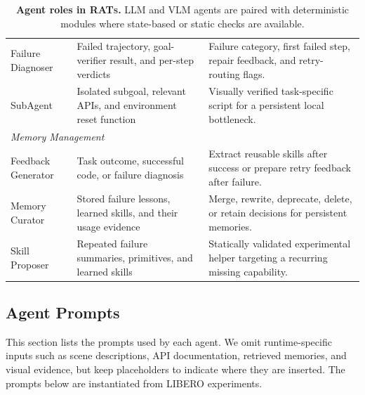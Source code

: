 \documentclass{llmxive}
\begin{document}
\begin{table}[t]
\begin{tabular}{p{} p{} p{}}
Failure Diagnoser &
Failed trajectory, goal-verifier result, and per-step verdicts &
Failure category, first failed step, repair feedback, and retry-routing flags. \\

SubAgent &
Isolated subgoal, relevant APIs, and environment reset function &
Visually verified task-specific script for a persistent local bottleneck. \\

\midrule
\multicolumn{3}{l}{\textit{Memory Management}} \\
\midrule
Feedback Generator &
Task outcome, successful code, or failure diagnosis &
Extract reusable skills after success or prepare retry feedback after failure. \\

Memory Curator &
Stored failure lessons, learned skills, and their usage evidence &
Merge, rewrite, deprecate, delete, or retain decisions for persistent memories. \\

Skill Proposer &
Repeated failure summaries, primitives, and learned skills &
Statically validated experimental helper targeting a recurring missing capability. \\
\bottomrule
\end{tabular}
\caption{
\textbf{Agent roles in \textsc{RATs}.}
LLM and VLM agents are paired with deterministic modules where state-based or
static checks are available.
}
\end{table}

\subsection{Agent Prompts}
\label{sec:appendix_stable_prompt_templates}
This section lists the prompts used by each agent. 
We omit runtime-specific inputs such as scene descriptions, API documentation, retrieved memories, and visual evidence, but keep placeholders to indicate where they are inserted. 
The prompts below are instantiated from LIBERO experiments.
\end{document}
